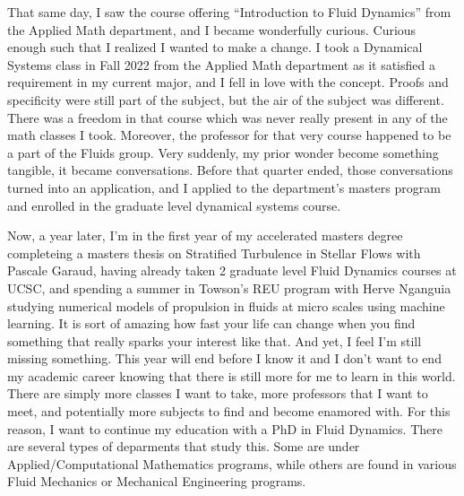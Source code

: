 \documentclass{article}
\begin{document}
That same day, I saw the course offering ``Introduction to Fluid Dynamics'' from the Applied Math department, and I became wonderfully curious.  Curious enough such that I realized I wanted to make a change. I took a Dynamical Systems class in Fall 2022 from the Applied Math department as it satisfied a requirement in my current major, and I fell in love with the concept. Proofs and specificity were still part of the subject, but the air of the subject was different. There was a freedom in that course which was never really present in any of the math classes I took. Moreover, the professor for that very course happened to be a part of the Fluids group. Very suddenly, my prior wonder become something tangible, it became conversations. Before that quarter ended, those conversations turned into an application, and I applied to the department's masters program and enrolled in the graduate level dynamical systems course. 

Now, a year later, I'm in the first year of my accelerated masters degree completeing a masters thesis on Stratified Turbulence in Stellar Flows with Pascale Garaud, having already taken 2 graduate level Fluid Dynamics courses at UCSC, and spending a summer in Towson's REU program with Herve Nganguia studying numerical models of propulsion in fluids at micro scales using machine learning. It is sort of amazing how fast your life can change when you find something that really sparks your interest like that. And yet, I feel I'm still missing something. This year will end before I know it and I don't want to end my academic career knowing that there is still more for me to learn in this world. There are simply more classes I want to take, more professors that I want to meet, and potentially more subjects to find and become enamored with. For this reason, I want to continue my education with a PhD in Fluid Dynamics. There are several types of deparments that study this. Some are under Applied/Computational Mathematics programs, while others are found in various Fluid Mechanics or Mechanical Engineering programs. 
\end{document}
